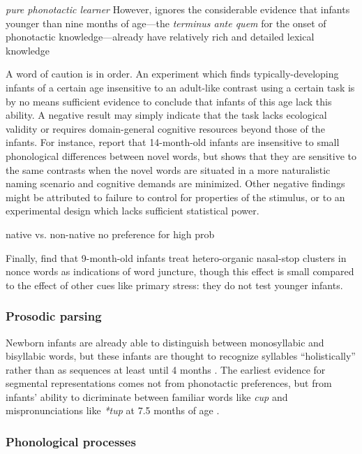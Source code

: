 \emph{pure phonotactic learner}
However, \citeauthor{Hayes2004b} ignores the considerable evidence that infants younger than nine months of age---the \emph{terminus ante quem} for the onset of phonotactic knowledge---already have relatively rich and detailed lexical knowledge

A word of caution is in order. An experiment which finds typically-developing infants of a certain age insensitive to an adult-like contrast using a certain task is by no means sufficient evidence to conclude that infants of this age lack this ability. A negative result may simply indicate that the task lacks ecological validity or requires domain-general cognitive resources beyond those of the infants. For instance, \citet{Werker2002} report that 14-month-old infants are insensitive to small phonological differences between novel words, but \citet{Fennell2006} shows that they are sensitive to the same contrasts when the novel words are situated in a more naturalistic naming scenario and cognitive demands are minimized. Other negative findings might be attributed to failure to control for properties of the stimulus, or to an experimental design which lacks sufficient statistical power.

\citet{Jusczyk1993b} native vs. non-native
\citet{Jusczyk1994} no preference for high prob
\citet{Friederici1993}

Finally, \citet{Mattys1999} find that 9-month-old infants treat hetero-organic nasal-stop clusters in nonce words as indications of word juncture, though this effect is small compared to the effect of other cues like primary stress: they do not test younger infants.

\subsubsection{Prosodic parsing}

Newborn infants are already able to distinguish between monosyllabic and bisyllabic words, but these infants are thought to recognize syllables ``holistically'' rather than as sequences at least until 4 months \citep[e.g.,]{Bertoncini1981,Eimas1999,Jusczyk1987}. The earliest evidence for segmental representations comes not from phonotactic preferences, but from infants' ability to dicriminate between familiar words like \emph{cup} and mispronunciations like \emph{*tup} at 7.5 months of age \citep{Jusczyk1995}.

\subsubsection{Phonological processes}

